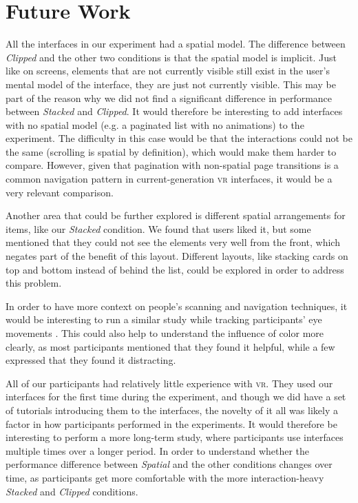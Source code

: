 \documentclass[nobib]{tufte-book} %
\begin{document}
\section{Future Work}
All the interfaces in our experiment had a spatial model. The difference between \emph{Clipped} and the other two conditions is that the spatial model is implicit. Just like on screens, elements that are not currently visible still exist in the user's mental model of the interface, they are just not currently visible. This may be part of the reason why we did not find a significant difference in performance between \emph{Stacked} and \emph{Clipped}. It would therefore be interesting to add interfaces with no spatial model (e.g. a paginated list with no animations) to the experiment. The difficulty in this case would be that the interactions could not be the same (scrolling is spatial by definition), which would make them harder to compare. However, given that pagination with non-spatial page transitions is a common navigation pattern in current-generation \textsc{vr} interfaces, it would be a very relevant comparison.

Another area that could be further explored is different spatial arrangements for items, like our \emph{Stacked} condition. We found that users liked it, but some mentioned that they could not see the elements very well from the front, which negates part of the benefit of this layout. Different layouts, like stacking cards on top and bottom instead of behind the list, could be explored in order to address this problem.

In order to have more context on people's scanning and navigation techniques, it would be interesting to run a similar study while tracking participants' eye movements \cite{card1984visual}. This could also help to understand the influence of color more clearly, as most participants mentioned that they found it helpful, while a few expressed that they found it distracting.

All of our participants had relatively little experience with \textsc{vr}. They used our interfaces for the first time during the experiment, and though we did have a set of tutorials introducing them to the interfaces, the novelty of it all was likely a factor in how participants performed in the experiments. It would therefore be interesting to perform a more long-term study, where participants use interfaces multiple times over a longer period. In order to understand whether the performance difference between \emph{Spatial} and the other conditions changes over time, as participants get more comfortable with the more interaction-heavy \emph{Stacked} and \emph{Clipped} conditions.
\end{document}
